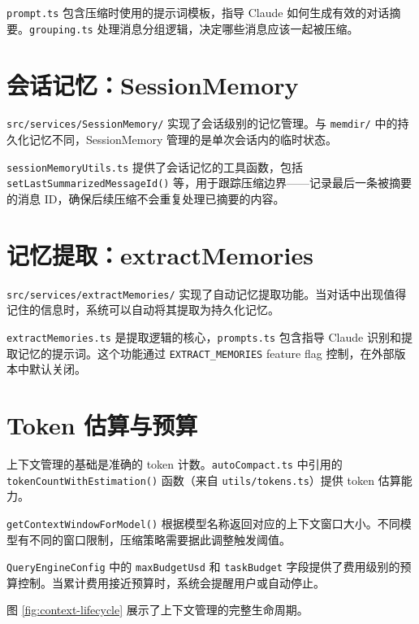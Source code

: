\texttt{prompt.ts} 包含压缩时使用的提示词模板，指导 Claude 如何生成有效的对话摘要。\texttt{grouping.ts} 处理消息分组逻辑，决定哪些消息应该一起被压缩。

\section{会话记忆：SessionMemory}

\texttt{src/services/SessionMemory/} 实现了会话级别的记忆管理。与 \texttt{memdir/} 中的持久化记忆不同，SessionMemory 管理的是单次会话内的临时状态。

\texttt{sessionMemoryUtils.ts} 提供了会话记忆的工具函数，包括 \texttt{setLastSummarizedMessageId()} 等，用于跟踪压缩边界——记录最后一条被摘要的消息 ID，确保后续压缩不会重复处理已摘要的内容。

\section{记忆提取：extractMemories}

\texttt{src/services/extractMemories/} 实现了自动记忆提取功能。当对话中出现值得记住的信息时，系统可以自动将其提取为持久化记忆。

\texttt{extractMemories.ts} 是提取逻辑的核心，\texttt{prompts.ts} 包含指导 Claude 识别和提取记忆的提示词。这个功能通过 \texttt{EXTRACT\_MEMORIES} feature flag 控制，在外部版本中默认关闭。

\section{Token 估算与预算}

上下文管理的基础是准确的 token 计数。\texttt{autoCompact.ts} 中引用的 \texttt{tokenCountWithEstimation()} 函数（来自 \texttt{utils/tokens.ts}）提供 token 估算能力。

\texttt{getContextWindowForModel()} 根据模型名称返回对应的上下文窗口大小。不同模型有不同的窗口限制，压缩策略需要据此调整触发阈值。

\texttt{QueryEngineConfig} 中的 \texttt{maxBudgetUsd} 和 \texttt{taskBudget} 字段提供了费用级别的预算控制。当累计费用接近预算时，系统会提醒用户或自动停止。

图 \ref{fig:context-lifecycle} 展示了上下文管理的完整生命周期。


